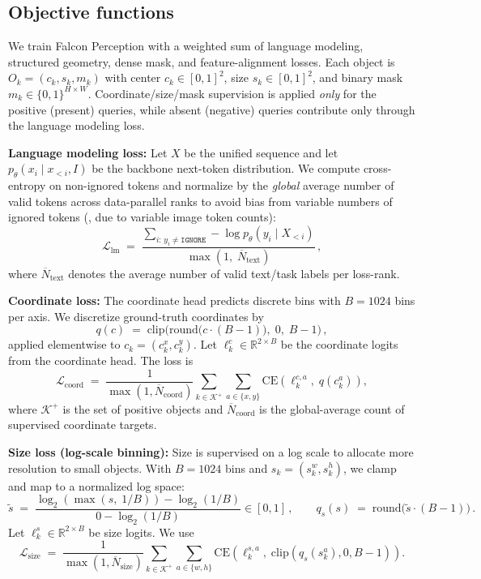 \subsection{Objective functions}
\label{sec:loss}

\noindent We train Falcon Perception with a weighted sum of language modeling, structured geometry, dense mask, and feature-alignment losses. Each object is $O_k=(c_k,s_k,m_k)$ with center $c_k\in[0,1]^2$, size $s_k\in[0,1]^2$, and binary mask $m_k\in\{0,1\}^{H\times W}$. Coordinate/size/mask supervision is applied \emph{only} for the positive (present) queries, while absent (negative) queries contribute only through the language modeling loss.

\noindent \textbf{Language modeling loss:}
Let $X$ be the unified sequence and let $p_\theta(x_i\mid x_{<i},I)$ be the backbone next-token distribution. We compute cross-entropy on non-ignored tokens and normalize by the \emph{global} average number of valid tokens across data-parallel ranks to avoid bias from variable numbers of ignored tokens (\eg, due to variable image token counts):
\begin{equation}
\mathcal{L}_{\text{lm}} \;=\; \frac{\sum_{i:\,y_i\neq \texttt{IGNORE}} -\log p_\theta(y_i \mid X_{<i})}{\max(1,\;\overline{N}_{\text{text}})}\,,
\end{equation}
where $\overline{N}_{\text{text}}$ denotes the average number of valid text/task labels per loss-rank.

\noindent \textbf{Coordinate loss:}
The coordinate head predicts discrete bins with $B=1024$ bins per axis. We discretize ground-truth coordinates by
\begin{equation}
q(c) \;=\; \mathrm{clip}\!\Big(\mathrm{round}\big(c\cdot(B-1)\big),\;0,\;B-1\Big)\,,
\end{equation}
applied elementwise to $c_k=(c^x_k,c^y_k)$. Let $\ell^c_k\in\mathbb{R}^{2\times B}$ be the coordinate logits from the coordinate head. The loss is
\begin{equation}
\mathcal{L}_{\text{coord}} \;=\; \frac{1}{\max(1,\overline{N}_{\text{coord}})}\sum_{k\in\mathcal{K}^+}\sum_{a\in\{x,y\}}
\mathrm{CE}\!\left(\ell^{c,a}_k,\; q(c^a_k)\right),
\end{equation}
where $\mathcal{K}^+$ is the set of positive objects and $\overline{N}_{\text{coord}}$ is the global-average count of supervised coordinate targets.

\noindent \textbf{Size loss (log-scale binning):}
Size is supervised on a log scale to allocate more resolution to small objects. With $B=1024$ bins and $s_k=(s^w_k,s^h_k)$, we clamp and map to a normalized log space:
\begin{equation}
\tilde{s} \;=\; \frac{\log_2(\max(s,\;1/B)) - \log_2(1/B)}{0-\log_2(1/B)} \in [0,1]\,,
\qquad
q_s(s) \;=\; \mathrm{round}\big(\tilde{s}\cdot(B-1)\big)\,.
\end{equation}
Let $\ell^s_k\in\mathbb{R}^{2\times B}$ be size logits. We use
\begin{equation}
\mathcal{L}_{\text{size}} \;=\; \frac{1}{\max(1,\overline{N}_{\text{size}})}\sum_{k\in\mathcal{K}^+}\sum_{a\in\{w,h\}}
\mathrm{CE}\!\left(\ell^{s,a}_k,\; \mathrm{clip}(q_s(s^a_k),0,B-1)\right).
\end{equation}

